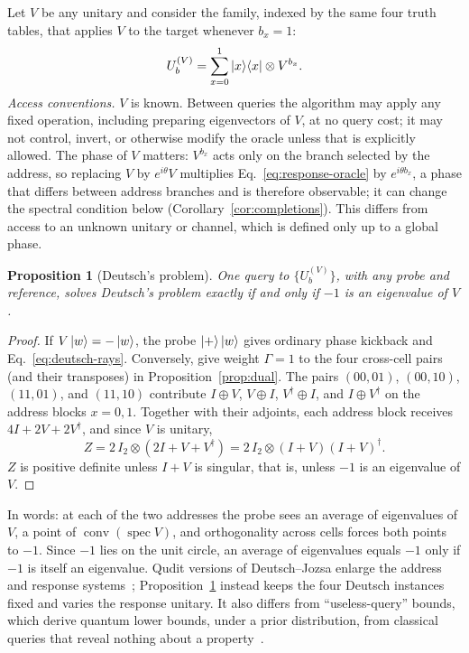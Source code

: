 \documentclass[
  aps,
  pra,
  reprint,
  nofootinbib
]{revtex4-2}
\newtheorem{proposition}{Proposition}
\begin{document}
Let \(V\) be any unitary and consider the family, indexed by the same four
truth tables, that applies \(V\) to the target whenever \(b_x=1\):
\begin{equation}
 U_b^{(V)}
 =\sum_{x=0}^1\ket x\!\bra x\otimes V^{b_x}.
 \label{eq:response-oracle}
\end{equation}
\emph{Access conventions.} \(V\) is known. Between queries the algorithm may
apply any fixed operation, including preparing eigenvectors of \(V\), at no
query cost; it may not control, invert, or otherwise modify the oracle unless
that is explicitly allowed. The phase of \(V\) matters: \(V^{b_x}\) acts only on
the branch selected by the address, so replacing \(V\) by \(e^{i\theta}V\)
multiplies Eq.~\eqref{eq:response-oracle} by \(e^{i\theta b_x}\), a phase that
differs between address branches and is therefore observable; it can change
the spectral condition below (Corollary~\ref{cor:completions}). This differs
from access to an unknown unitary or channel, which is defined only up to a
global phase.

\begin{proposition}[Deutsch's problem]\label{prop:deutsch}
One query to \(\{U_b^{(V)}\}\), with any probe and reference, solves Deutsch's
problem exactly if and only if \(-1\) is an eigenvalue of \(V\).
\end{proposition}

\begin{proof}
If \(V\ket w=-\ket w\), the probe \(\ket+\ket w\) gives ordinary phase kickback
and Eq.~\eqref{eq:deutsch-rays}. Conversely, give weight \(\Gamma=1\) to the
four cross-cell pairs (and their transposes) in
Proposition~\ref{prop:dual}. The pairs \((00,01)\), \((00,10)\), \((11,01)\),
and \((11,10)\) contribute
\(I\oplus V\), \(V\oplus I\), \(V^\dagger\oplus I\), and \(I\oplus V^\dagger\)
on the address blocks \(x=0,1\). Together with their adjoints, each address
block receives \(4I+2V+2V^\dagger\), and since \(V\) is unitary,
\begin{equation}
 Z=2\,I_2\otimes(2I+V+V^\dagger)
 =2\,I_2\otimes(I+V)(I+V)^\dagger .
 \label{eq:deutsch-witness}
\end{equation}
\(Z\) is positive definite unless \(I+V\) is singular, that is, unless \(-1\) is
an eigenvalue of \(V\).
\end{proof}

In words: at each of the two addresses the probe sees an average of
eigenvalues of \(V\), a point of \(\operatorname{conv}(\operatorname{spec}V)\),
and orthogonality across cells forces both points to \(-1\). Since \(-1\) lies
on the unit circle, an average of eigenvalues equals \(-1\) only if \(-1\) is
itself an eigenvalue. Qudit versions of Deutsch--Jozsa enlarge the address and
response systems~\cite{Cereceda2004QuditDeutsch,deutsch:92,cleve:98};
Proposition~\ref{prop:deutsch} instead keeps the four Deutsch instances fixed and
varies the response unitary. It also differs from ``useless-query'' bounds,
which derive quantum lower bounds, under a prior distribution, from classical
queries that reveal nothing about a property~\cite{MeyerPommersheim2011}.
\end{document}
